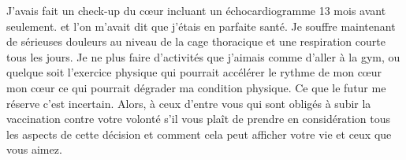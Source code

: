 J’avais fait un check-up du cœur incluant un échocardiogramme 13 mois avant
seulement. et l’on m’avait dit que j’étais en parfaite santé. Je souffre
maintenant de sérieuses douleurs au niveau de la cage thoracique et une
respiration courte tous les jours. Je ne plus faire d’activités que j’aimais
comme d’aller à la gym, ou quelque soit l’exercice physique qui pourrait
accélérer le rythme de mon cœur mon cœur ce qui pourrait dégrader ma condition
physique. Ce que le futur me réserve c’est incertain. Alors, à ceux d’entre vous
qui sont obligés à subir la vaccination contre votre volonté s’il vous plaît de
prendre en considération tous les aspects de cette décision et comment cela peut
afficher votre vie et ceux que vous aimez.

